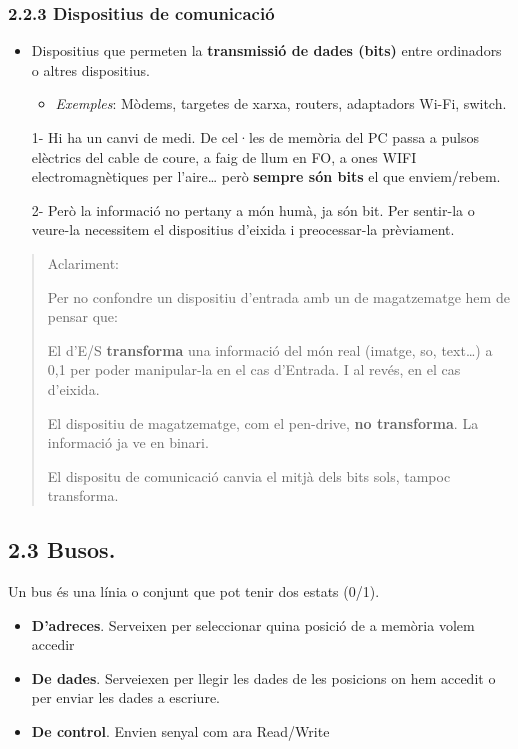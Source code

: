 \documentclass[
  12 pt,
  a4paper,
]{article}
\providecommand{\tightlist}{%
  \setlength{\itemsep}{0pt}\setlength{\parskip}{0pt}}
\begin{document}
\subsubsection{2.2.3 Dispositius de
comunicació}\label{dispositius-de-comunicaciuxf3}

\begin{itemize}
\item
  Dispositius que permeten la \textbf{transmissió de dades (bits)} entre
  ordinadors o altres dispositius.

  \begin{itemize}
  \tightlist
  \item
    \emph{Exemples}: Mòdems, targetes de xarxa, routers, adaptadors
    Wi-Fi, switch.
  \end{itemize}

  1- Hi ha un canvi de medi. De cel·les de memòria del PC passa a pulsos
  elèctrics del cable de coure, a faig de llum en FO, a ones WIFI
  electromagnètiques per l'aire\ldots{} però \textbf{sempre són bits} el
  que enviem/rebem.

  2- Però la informació no pertany a món humà, ja són bit. Per sentir-la
  o veure-la necessitem el dispositius d'eixida i preocessar-la
  prèviament.
\end{itemize}

\begin{quote}
Aclariment:

Per no confondre un dispositiu d'entrada amb un de magatzematge hem de
pensar que:

El d'E/S \textbf{transforma} una informació del món real (imatge, so,
text\ldots) a 0,1 per poder manipular-la en el cas d'Entrada. I al
revés, en el cas d'eixida.

El dispositiu de magatzematge, com el pen-drive, \textbf{no transforma}.
La informació ja ve en binari.

El dispositu de comunicació canvia el mitjà dels bits sols, tampoc
transforma.
\end{quote}

\subsection{2.3 Busos.}\label{busos.}

Un bus és una línia o conjunt que pot tenir dos estats (0/1).

\begin{itemize}
\tightlist
\item
  \textbf{D'adreces}. Serveixen per seleccionar quina posició de a
  memòria volem accedir
\item
  \textbf{De dades}. Serveiexen per llegir les dades de les posicions on
  hem accedit o per enviar les dades a escriure.
\item
  \textbf{De control}. Envien senyal com ara Read/Write
\end{itemize}
\end{document}
